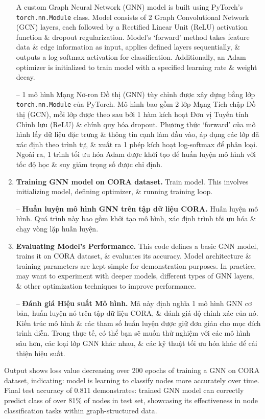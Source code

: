 \documentclass{article}
\begin{document}
\begin{enumerate}
    A custom Graph Neural Network (GNN) model is built using PyTorch's {\tt torch.nn.Module} class. Model consists of 2 Graph Convolutional Network (GCN) layers, each followed by a Rectified Linear Unit (ReLU) activation function \& dropout regularization. Model's `forward' method takes feature data \& edge information as input, applies defined layers sequentially, \& outputs a log-softmax activation for classification. Additionally, an Adam optimizer is initialized to train model with a specified learning rate \& weight decay.

    -- 1 mô hình Mạng Nơ-ron Đồ thị (GNN) tùy chỉnh được xây dựng bằng lớp {\tt torch.nn.Module} của PyTorch. Mô hình bao gồm 2 lớp Mạng Tích chập Đồ thị (GCN), mỗi lớp được theo sau bởi 1 hàm kích hoạt Đơn vị Tuyến tính Chỉnh lưu (ReLU) \& chính quy hóa dropout. Phương thức `forward' của mô hình lấy dữ liệu đặc trưng \& thông tin cạnh làm đầu vào, áp dụng các lớp đã xác định theo trình tự, \& xuất ra 1 phép kích hoạt log-softmax để phân loại. Ngoài ra, 1 trình tối ưu hóa Adam được khởi tạo để huấn luyện mô hình với tốc độ học \& suy giảm trọng số được chỉ định.
    \item {\bf Training GNN model on CORA dataset.} Train model. This involves initializing model, defining optimizer, \& running training loop.

    -- {\bf Huấn luyện mô hình GNN trên tập dữ liệu CORA.} Huấn luyện mô hình. Quá trình này bao gồm khởi tạo mô hình, xác định trình tối ưu hóa \& chạy vòng lặp huấn luyện.
    \item {\bf Evaluating Model's Performance.} This code defines a basic GNN model, trains it on CORA dataset, \& evaluates its accuracy. Model architecture \& training parameters are kept simple for demonstration purposes. In practice, may want to experiment with deeper models, different types of GNN layers, \& other optimization techniques to improve performance.

    -- {\bf Đánh giá Hiệu suất Mô hình.} Mã này định nghĩa 1 mô hình GNN cơ bản, huấn luyện nó trên tập dữ liệu CORA, \& đánh giá độ chính xác của nó. Kiến trúc mô hình \& các tham số huấn luyện được giữ đơn giản cho mục đích trình diễn. Trong thực tế, có thể bạn sẽ muốn thử nghiệm với các mô hình sâu hơn, các loại lớp GNN khác nhau, \& các kỹ thuật tối ưu hóa khác để cải thiện hiệu suất.
\end{enumerate}
Output shows loss value decreasing over 200 epochs of training a GNN on CORA dataset, indicating: model is learning to classify nodes more accurately over time. Final test accuracy of 0.811 demonstrates: trained GNN model can correctly predict class of over 81\% of nodes in test set, showcasing its effectiveness in node classification tasks within graph-structured data.
\end{document}
